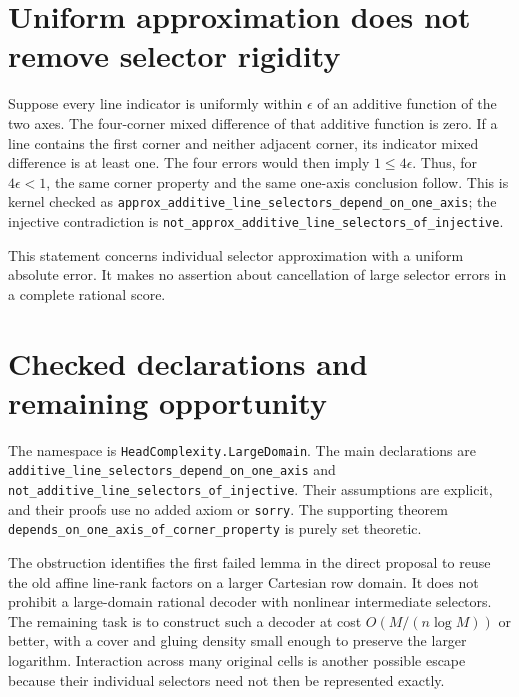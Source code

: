 \documentclass[11pt]{article}
\begin{document}
\section{Uniform approximation does not remove selector rigidity}

Suppose every line indicator is uniformly within $\epsilon$ of an additive
function of the two axes. The four-corner mixed difference of that additive
function is zero. If a line contains the first corner and neither adjacent
corner, its indicator mixed difference is at least one. The four errors
would then imply $1\leq4\epsilon$. Thus, for $4\epsilon<1$, the same corner
property and the same one-axis conclusion follow. This is kernel checked as
\texttt{approx\_additive\_line\_selectors\_depend\_on\_one\_axis}; the injective
contradiction is
\texttt{not\_approx\_additive\_line\_selectors\_of\_injective}.

This statement concerns individual selector approximation with a uniform
absolute error. It makes no assertion about cancellation of large selector
errors in a complete rational score.

\section{Checked declarations and remaining opportunity}

The namespace is \texttt{HeadComplexity.LargeDomain}. The main declarations
are \texttt{additive\_line\_selectors\_depend\_on\_one\_axis} and
\texttt{not\_additive\_line\_selectors\_of\_injective}. Their assumptions
are explicit, and their proofs use no added axiom or \texttt{sorry}.
The supporting theorem \texttt{depends\_on\_one\_axis\_of\_corner\_property}
is purely set theoretic.

The obstruction identifies the first failed lemma in the direct proposal
to reuse the old affine line-rank factors on a larger Cartesian row
domain. It does not prohibit a large-domain rational decoder with
nonlinear intermediate selectors. The remaining task is to construct
such a decoder at cost $O(M/(n\log M))$ or better, with a cover and
gluing density small enough to preserve the larger logarithm. Interaction
across many original cells is another possible escape because their
individual selectors need not then be represented exactly.
\end{document}
